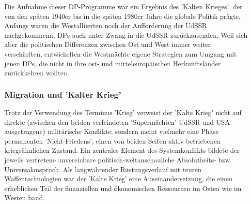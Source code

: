 \documentclass[letterpaper, 12pt]{article}
\let\tempsubsubsection\subsubsection
\renewcommand\subsubsection[1]{\vspace{0cm}\tempsubsubsection{#1}\vspace{0cm}}
\begin{document}
Die Aufnahme dieser DP-Programme war ein Ergebnis des 'Kalten Krieges', der von den späten 1940er bis in die späten 1980er Jahre die globale Politik prägte. Anfangs waren die Westalliierten noch der Aufforderung der UdSSR nachgekommenn, DPs auch unter Zwang in die UdSSR zurückzusenden. Weil sich aber die politischen Differenzen zwischen Ost und West immer weiter verschärften, entwickelten die Westmächte eigene Strategien zum Umgang mit jenen DPs, die nicht in ihre ost- und mitteleuropäischen Herkunftsländer zurückkehren wollten.

\subsubsection{Migration und 'Kalter Krieg'}

Trotz der Verwendung des Terminus 'Krieg' verweist der 'Kalte Krieg' nicht auf direkte (zwischen den beiden verfeindeten 'Supermächten' UdSSR und USA ausgetragene) militärische Konflikte, sondern meint vielmehr eine Phase permanenten 'Nicht-Friedens', einen von beiden Seiten aktiv betriebenen kriegsähnlichen Zustand. Ein zentrales Element des Systemkonflikts bildete der jeweils vertretene unvereinbare politisch-weltanschauliche Absolutheits- bzw. Universalanspruch. Als langwährender Rüstungsverlauf mit teuren Waffentechnologien war der 'Kalte Krieg' eine Auseinandersetzung, die einen erheblichen Teil der finanziellen und ökonomischen Ressourcen im Osten wie im Westen band. \\
\end{document}
